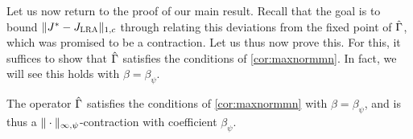 \documentclass[twocolumn]{IEEEtran}
\begin{document}
Let us now return to the proof of our main result. Recall that the goal is to bound
$\|J^*-J_{\text{\sc LRA}}\|_{1,c}$ through relating this deviations from the fixed point of $\hat{\Gamma}$, which was promised to be a contraction.
Let us thus now prove this.
For this, it suffices to show that $\hat{\Gamma}$ satisfies the conditions of \cref{cor:maxnormmn}.
In fact, we will see this holds with $\beta =\beta_\psi$.
\begin{proposition}\label{tgmonotone}\label{gshiftmn}
The operator $\hat{\Gamma}$ satisfies the conditions of \cref{cor:maxnormmn} with $\beta =\beta_\psi$, and is thus a
$\|\cdot\|_{\infty,\psi}$-contraction with coefficient $\beta_\psi$.
\end{proposition}
\end{document}
